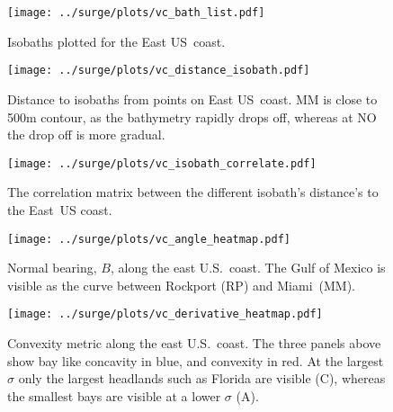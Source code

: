 \begin{figure}[htb!]
\texttt{[image: ../surge/plots/vc\_bath\_list.pdf]}
\vspace{-25pt}

\caption{Isobaths plotted for the East US~coast.}
\label{fig:bath}
\texttt{[image: ../surge/plots/vc\_distance\_isobath.pdf]}
\vspace{-25pt}

\caption{Distance to isobaths from points on East US~coast. MM is close to 500m
contour, as the bathymetry rapidly drops off, whereas at NO the drop off is more
gradual.}
\label{fig:vc_isobath}
\texttt{[image: ../surge/plots/vc\_isobath\_correlate.pdf]}
\vspace{-25pt}

\caption{The correlation matrix between the different isobath's distance's to
the East~US coast.}
\label{fig:vc_isobath}
\end{figure}


\begin{figure}[htb!]
\centering
\texttt{[image: ../surge/plots/vc\_angle\_heatmap.pdf]}
\caption{Normal bearing, $B$, along the east U.S.~coast.
         The Gulf of Mexico is visible as the curve between Rockport (RP)
         and Miami~(MM).
         }
\label{fig:angle_heatmap}

\texttt{[image: ../surge/plots/vc\_derivative\_heatmap.pdf]}
\caption{Convexity metric along the east U.S.~coast.
         The three panels above show bay like concavity in blue, and convexity
         in red. At the largest $\sigma$ only the largest headlands such as
         Florida are visible (C), whereas the smallest bays are visible at a lower
        $\sigma$ (A).
}
\label{fig:derivative}
\end{figure}
